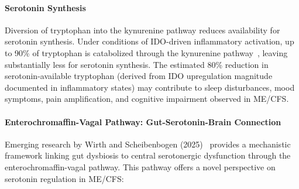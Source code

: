 \paragraph{Serotonin Synthesis}
Diversion of tryptophan into the kynurenine pathway reduces availability for serotonin synthesis. Under conditions of IDO-driven inflammatory activation, up to 90\% of tryptophan is catabolized through the kynurenine pathway~\cite{Dehhaghi2022kynurenine, Dehhaghi2022AD}, leaving substantially less for serotonin synthesis. The estimated 80\% reduction in serotonin-available tryptophan (derived from IDO upregulation magnitude documented in inflammatory states) may contribute to sleep disturbances, mood symptoms, pain amplification, and cognitive impairment observed in ME/CFS.

\paragraph{Enterochromaffin-Vagal Pathway: Gut-Serotonin-Brain Connection}

Emerging research by Wirth and Scheibenbogen (2025)~\cite{WirthScheibenbogen2025Neurotransmitter} provides a mechanistic framework linking gut dysbiosis to central serotonergic dysfunction through the enterochromaffin-vagal pathway. This pathway offers a novel perspective on serotonin regulation in ME/CFS:

